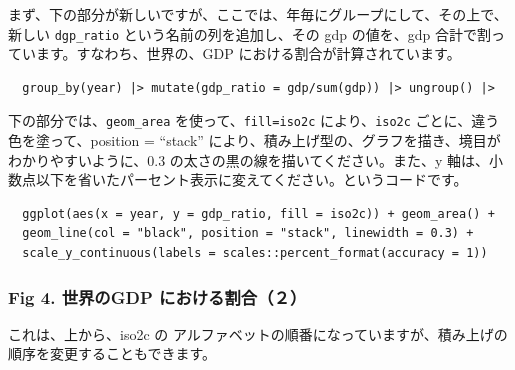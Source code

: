 \documentclass[
  xelatex, ja=standard]{bxjsbook}
\theoremstyle{definition}
\theoremstyle{definition}
\theoremstyle{definition}
\theoremstyle{definition}
\theoremstyle{remark}
\begin{document}
まず、下の部分が新しいですが、ここでは、年毎にグループにして、その上で、新しい \texttt{dgp\_ratio} という名前の列を追加し、その gdp の値を、gdp 合計で割っています。すなわち、世界の、GDP における割合が計算されています。

\begin{verbatim}
  group_by(year) |> mutate(gdp_ratio = gdp/sum(gdp)) |> ungroup() |>
\end{verbatim}

下の部分では、\texttt{geom\_area} を使って、\texttt{fill=iso2c} により、\texttt{iso2c} ごとに、違う色を塗って、position = ``stack'' により、積み上げ型の、グラフを描き、境目がわかりやすいように、0.3 の太さの黒の線を描いてください。また、y 軸は、小数点以下を省いたパーセント表示に変えてください。というコードです。

\begin{verbatim}
  ggplot(aes(x = year, y = gdp_ratio, fill = iso2c)) + geom_area() +
  geom_line(col = "black", position = "stack", linewidth = 0.3) + 
  scale_y_continuous(labels = scales::percent_format(accuracy = 1))
\end{verbatim}

\hypertarget{fig-4.-ux4e16ux754cux306egdp-ux306bux304aux3051ux308bux5272ux5408uxff12}{%
\subsubsection{Fig 4. 世界のGDP における割合（２）}\label{fig-4.-ux4e16ux754cux306egdp-ux306bux304aux3051ux308bux5272ux5408uxff12}}

これは、上から、iso2c の アルファベットの順番になっていますが、積み上げの順序を変更することもできます。
\end{document}

